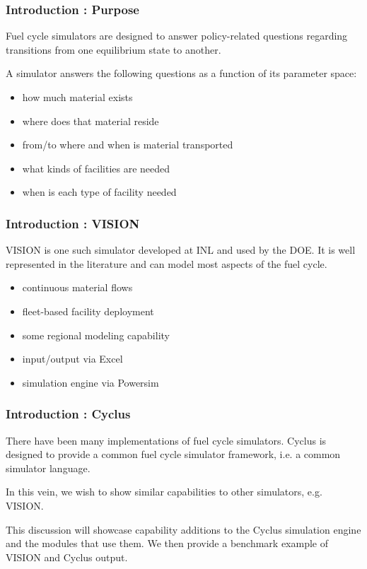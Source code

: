 
\begin{frame}[ctb!]
  \frametitle{Introduction : Purpose}
  Fuel cycle simulators are designed to answer policy-related questions
  regarding transitions from one equilibrium state to another.

  \vspace{0.2cm}

  \pause
  A simulator answers the following questions as a function of its 
  parameter space:
  \begin{itemize}
    \item how much material exists
    \item where does that material reside
    \item from/to where and when is material transported
    \item what kinds of facilities are needed
    \item when is each type of facility needed
  \end{itemize}
\end{frame}

\begin{frame}[ctb!]
  \frametitle{Introduction : VISION}
  VISION is one such simulator developed at INL and used by the DOE. 
  It is well represented in the literature and can model most aspects 
  of the fuel cycle. \cite{yacout_vision_2006}
  \begin{itemize}
    \item continuous material flows
    \item fleet-based facility deployment
    \item some regional modeling capability
    \item input/output via Excel
    \item simulation engine via Powersim
  \end{itemize}
\end{frame}

\begin{frame}[ctb!]
  \frametitle{Introduction : Cyclus}
  There have been many implementations of fuel cycle simulators. 
  Cyclus is designed to provide a common fuel cycle simulator 
  framework, i.e. a common simulator language.

  \vspace{0.2cm}

  In this vein, we wish to show similar capabilities to other 
  simulators, e.g. VISION.

  \vspace{0.2cm}

  \pause
  This discussion will showcase capability additions to the Cyclus
  simulation engine and the modules that use them. We then provide a
  benchmark example of VISION and Cyclus output.
\end{frame}
